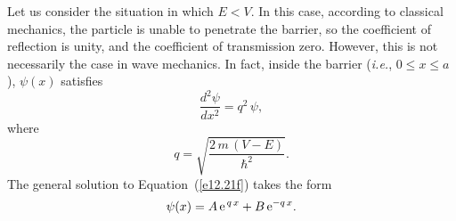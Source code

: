 Let us consider the situation in which  $E< V$. In this case, according to classical mechanics, the particle is
unable to penetrate the barrier, so the coefficient of reflection is unity, and the coefficient
of transmission  zero. 
However, this is not necessarily the case in wave mechanics.
In fact, inside the barrier ({\em i.e.}, $0\leq x \leq a$), $\psi(x)$ satisfies
\begin{equation}\label{e12.21f}
\frac{d^2 \psi}{d x^2} =  q^2\,\psi,
\end{equation}
where
\begin{equation}
q = \sqrt{\frac{2\,m\,(V-E)}{\hbar^2}}.
\end{equation}
The general
solution to Equation~(\ref{e12.21f})  takes the
form
\begin{equation}
\psi(x) = A\,{\rm e}^{\,q\,x} + B\,{\rm e}^{-q\,x}.
\end{equation}

